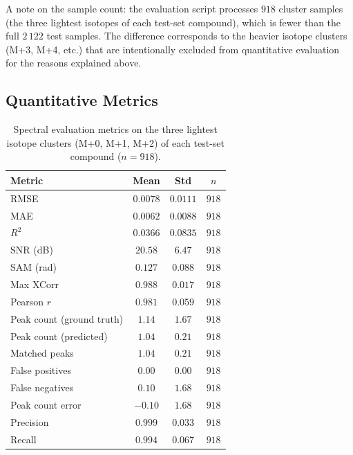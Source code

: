 \documentclass[12pt,a4paper]{report}
\begin{document}
A note on the sample count: the evaluation script processes $918$ cluster samples (the three lightest isotopes of each test-set compound), which is fewer than the full $2\,122$ test samples.  The difference corresponds to the heavier isotope clusters (M+3, M+4, etc.) that are intentionally excluded from quantitative evaluation for the reasons explained above.

\subsection{Quantitative Metrics}

\begin{table}[H]
  \centering
  \caption{Spectral evaluation metrics on the three lightest isotope clusters (M+0, M+1, M+2) of each test-set compound ($n = 918$).}
  \label{tab:test-metrics-light}
  \begin{tabular}{@{}lccc@{}}
    \toprule
    \textbf{Metric} & \textbf{Mean} & \textbf{Std} & \textbf{$n$} \\
    \midrule
    RMSE                    & $0.0078$ & $0.0111$ & $918$ \\
    MAE                     & $0.0062$ & $0.0088$ & $918$ \\
    $R^2$                   & $0.0366$ & $0.0835$ & $918$ \\
    SNR (dB)                & $20.58$  & $6.47$   & $918$ \\
    SAM (rad)               & $0.127$  & $0.088$  & $918$ \\
    Max XCorr               & $0.988$  & $0.017$  & $918$ \\
    Pearson $r$             & $0.981$  & $0.059$  & $918$ \\
    \midrule
    Peak count (ground truth) & $1.14$  & $1.67$  & $918$ \\
    Peak count (predicted)    & $1.04$  & $0.21$  & $918$ \\
    Matched peaks             & $1.04$  & $0.21$  & $918$ \\
    False positives           & $0.00$  & $0.00$  & $918$ \\
    False negatives           & $0.10$  & $1.68$  & $918$ \\
    Peak count error          & $-0.10$ & $1.68$  & $918$ \\
    \midrule
    Precision                & $0.999$  & $0.033$  & $918$ \\
    Recall                   & $0.994$  & $0.067$  & $918$ \\

\end{tabular}
\end{table}
\end{document}
